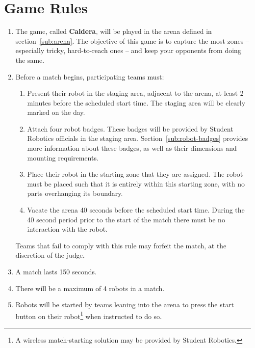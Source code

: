 \section {Game Rules}
\label{game-rules}

\begin{enumerate}
\item The game, called \textbf{Caldera}, will be played in the arena defined in section~\ref{sub:arena}.  The objective of this game is to capture the most zones -- especially tricky, hard-to-reach ones -- and keep your opponents from doing the same.

\item Before a match begins, participating teams must:
\begin {enumerate}
  \item Present their robot in the staging area, adjacent to the arena, at least 2 minutes before the scheduled start time.
        The staging area will be clearly marked on the day.

  \item Attach four robot badges.
        These badges will be provided by Student Robotics officials in the staging area.
        Section~\ref{sub:robot-badges} provides more information about these badges, as well as their dimensions and mounting requirements.

  \item Place their robot in the starting zone that they are assigned.
        The robot must be placed such that it is entirely within this starting zone, with no parts overhanging its boundary.

  \item Vacate the arena 40 seconds before the scheduled start time.
        During the 40 second period prior to the start of the match there must be no interaction with the robot.
\end{enumerate}
  Teams that fail to comply with this rule may forfeit the match, at the discretion of the judge.

\item A match lasts 150 seconds.

\item There will be a maximum of 4 robots in a match.

\item Robots will be started by teams leaning into the arena to press the start button on their robot\footnote{A wireless match-starting solution may be provided by Student Robotics.} when instructed to do so.


\end{enumerate}
